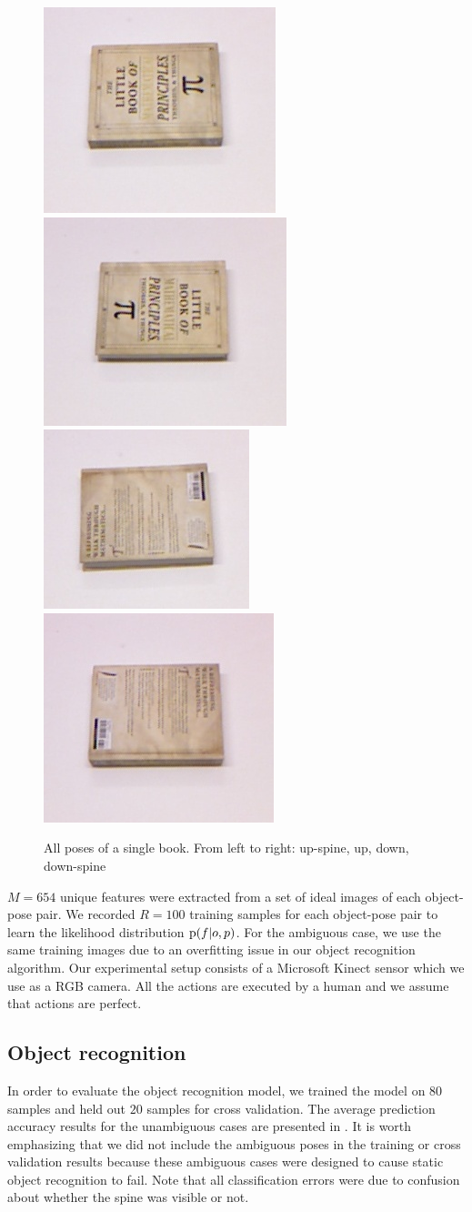     \begin{figure}[h]
        \centering
        \includegraphics[width = 0.2\columnwidth]{pics/math_cover1.jpg}
        \includegraphics[width = 0.2\columnwidth]{pics/math_cover1_rot.jpg}
        \includegraphics[width = 0.2\columnwidth]{pics/math_down.jpg}
        \includegraphics[width = 0.2\columnwidth]{pics/math_down_rot.jpg}
        \caption{All poses of a single book. From left to right: up-spine, up, down, down-spine} %
    \label{fig:pose_dataset}
    \end{figure}

    $M = 654$ unique features were extracted from a set of ideal images of each object-pose pair. We recorded $R = 100$ training samples for each object-pose pair to learn the likelihood distribution $\text{p}(f|o,p)$. For the ambiguous case, we use the same training images due to an overfitting issue in our object recognition algorithm. Our experimental setup consists of a Microsoft Kinect sensor which we use as a RGB camera. All the actions are executed by a human and we assume that actions are perfect. 

    \subsection{Object recognition}
        In order to evaluate the object recognition model, we trained the model on $80$ samples and held out $20$ samples for cross validation. The average prediction accuracy results for the unambiguous cases are presented in . It is worth emphasizing that we did not include the ambiguous poses in the training or cross validation results because these ambiguous cases were designed to cause static object recognition to fail. Note that all classification errors were due to confusion about whether the spine was visible or not.
        
